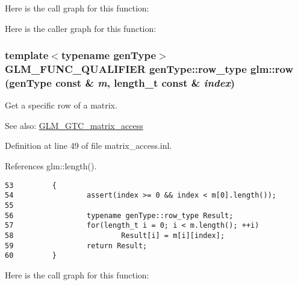 Here is the call graph for this function:

Here is the caller graph for this function:\hypertarget{group__gtc__matrix__access_g46e78366e4057c64e554cc442e407cca}{
\subsubsection[row]{\setlength{\rightskip}{0pt plus 5cm}template$<$typename genType$>$ GLM\_\-FUNC\_\-QUALIFIER genType::row\_\-type glm::row (genType const \& {\em m}, \/  length\_\-t const \& {\em index})}}
\label{group__gtc__matrix__access_g46e78366e4057c64e554cc442e407cca}


Get a specific row of a matrix. \begin{Desc}
\item[See also:]\hyperlink{group__gtc__matrix__access}{GLM\_\-GTC\_\-matrix\_\-access} \end{Desc}


Definition at line 49 of file matrix\_\-access.inl.

References glm::length().

\begin{Code}\begin{verbatim}53         {
54                 assert(index >= 0 && index < m[0].length());
55 
56                 typename genType::row_type Result;
57                 for(length_t i = 0; i < m.length(); ++i)
58                         Result[i] = m[i][index];
59                 return Result;
60         }
\end{verbatim}
\end{Code}




Here is the call graph for this function: